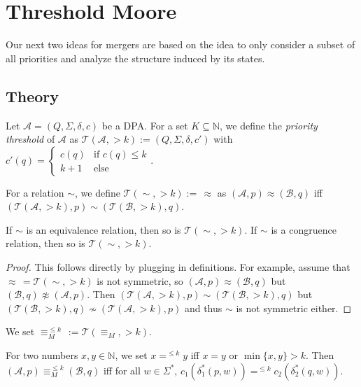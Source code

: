 \chapter{Threshold Moore}
\label{chap:tm}

Our next two ideas for mergers are based on the idea to only consider a subset of all priorities and analyze the structure induced by its states.

\section{Theory}

\begin{defn}
	Let $\mathcal{A} = (Q, \Sigma, \delta, c)$ be a DPA. For a set $K \subseteq \mathbb{N}$, we define the \emph{priority threshold} of $\mathcal{A}$ as $\mathcal{T}(\mathcal{A}, >k) := (Q, \Sigma, \delta, c')$ with $c'(q) = \begin{cases} c(q) & \text{if } c(q) \leq k \\ k + 1 & \text{else} \end{cases}$.
	
	For a relation $\sim$, we define $\mathcal{T}(\sim, >k) :=\, \approx$ as $(\mathcal{A}, p) \approx (\mathcal{B}, q)$ iff $(\mathcal{T}(\mathcal{A}, >k), p) \sim (\mathcal{T}(\mathcal{B}, >k), q)$.
\end{defn}

\begin{lem}
	If $\sim$ is an equivalence relation, then so is $\mathcal{T}(\sim, >k)$. If $\sim$ is a congruence relation, then so is $\mathcal{T}(\sim, >k)$.
\end{lem}

\begin{proof}
	This follows directly by plugging in definitions. For example, assume that $\approx \,= \mathcal{T}(\sim, >k)$ is not symmetric, so $(\mathcal{A}, p) \approx (\mathcal{B}, q)$ but $(\mathcal{B}, q) \not\approx (\mathcal{A}, p)$. Then $(\mathcal{T}(\mathcal{A}, >k), p) \sim (\mathcal{T}(\mathcal{B}, >k), q)$ but $(\mathcal{T}(\mathcal{B}, >k), q) \not\sim (\mathcal{T}(\mathcal{A}, >k), p)$ and thus $\sim$ is not symmetric either.
\end{proof}

\begin{defn}
	We set $\equiv_M^{\leq k} \,:= \mathcal{T}(\equiv_M, >k)$.
\end{defn}

\begin{lem}
	For two numbers $x, y \in \mathbb{N}$, we set $x =^{\leq k} y$ iff $x = y$ or $\min \{x, y\} > k$. Then \linebreak
	$(\mathcal{A}, p) \equiv_M^{\leq k} (\mathcal{B}, q)$ iff for all $w \in \Sigma^*$, $c_1(\delta_1^*(p, w)) =^{\leq k} c_2(\delta_2^*(q, w))$.
\end{lem}

